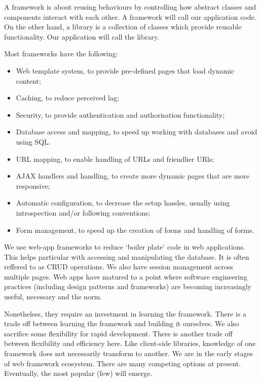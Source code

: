 \documentclass[a4paper, openany]{memoir}
\begin{document}
A framework is about reusing behaviours by controlling how abstract classes and components interact with each other. A framework will call our application code. On the other hand, a library is a collection of classes which provide reusable functionality. Our application will call the library.

Most frameworks have the following:
\begin{itemize}
    \item Web template system, to provide pre-defined pages that load dynamic content;
    \item Caching, to reduce perceived lag;
    \item Security, to provide authentication and authorisation functionality;
    \item Database access and mapping, to speed up working with databases and avoid using SQL.
    \item URL mapping, to enable handling of URLs and friendlier URls;
    \item AJAX handlers and handling, to create more dynamic pages that are more responsive;
    \item Automatic configuration, to decrease the setup hassles, usually using introspection and/or following conventions;
    \item Form management, to speed up the creation of forms and handling of forms.
\end{itemize}
We use web-app frameworks to reduce `boiler plate' code in web applications. This helps particular with accessing and manipulating the database. It is often reffered to as CRUD operations. We also have session management across multiple pages. Web apps have matured to a point where software engineering practices (including design patterns and frameworks) are becoming increasingly useful, necessary and the norm.

Nonetheless, they require an investment in learning the framework. There is a trade off between learning the framework and building it ourselves. We also sacrifice some flexibility for rapid development. There is another trade off between flexibility and efficiency here. Like client-side libraries, knowledge of one framework does not necessarily transform to another. We are in the early stages of web framework ecosystem. There are many competing options at present. Eventually, the most popular (few) will emerge.
\end{document}
